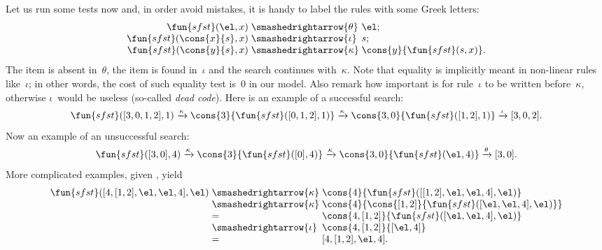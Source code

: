 Let us run some tests now and, in order avoid mistakes, it is handy to
label the rules with some Greek letters:
\begin{equation*}
\begin{array}{r@{\;}l@{\;}l}
\fun{sfst}(\el,x)          & \smashedrightarrow{\theta} & \el;\\
\fun{sfst}(\cons{x}{s},x)  & \smashedrightarrow{\iota}  & s;\\
\fun{sfst}(\cons{y}{s},x)  & \smashedrightarrow{\kappa} &
\cons{y}{\fun{sfst}(s,x)}.
\end{array}
\end{equation*}
The item is absent in~\(\theta\), the item is found in~\(\iota\) and
the search continues with~\(\kappa\). Note that equality is implicitly
meant in non\hyp{}linear rules like~\(\iota\); in other words, the
cost of such equality test is~\(0\) in our model. Also remark how
important is for rule~\(\iota\) to be written before~\(\kappa\),
otherwise \(\iota\)~would be useless (so\hyp{}called \emph{dead
  code}). Here is an
example of a successful search:
\begin{equation*}
\fun{sfst}([3,0,1,2],1) \xrightarrow{\smash{\kappa}}
\cons{3}{\fun{sfst}([0,1,2],1)} \xrightarrow{\smash{\kappa}}
\cons{3,0}{\fun{sfst}([1,2],1)} \xrightarrow{\smash{\iota}} [3,0,2].
\end{equation*}
Now an example of an unsuccessful search:
\begin{equation*}
\fun{sfst}([3,0],4) \xrightarrow{\smash{\kappa}}
\cons{3}{\fun{sfst}([0],4)} \xrightarrow{\smash{\kappa}}
\cons{3,0}{\fun{sfst}(\el,4)} \xrightarrow{\smash{\theta}}
[3,0].
\end{equation*}
More complicated examples, given , yield
\begin{equation*}
\begin{array}{r@{\;}l@{\;}l}
\fun{sfst}([4,[1,2],\el,\el,4],\el)
& \smashedrightarrow{\kappa} &
  \cons{4}{\fun{sfst}([[1,2],\el,\el,4],\el)}\\
& \smashedrightarrow{\kappa} &
  \cons{4}{\cons{[1,2]}{\fun{sfst}([\el,\el,4],\el)}}\\
& = & \cons{4, [1,2]}{\fun{sfst}([\el,\el,4],\el)}\\
& \smashedrightarrow{\iota} & \cons{4,[1,2]}{[\el,4]}\\
& = & [4,[1,2],\el,4].
\end{array}
\end{equation*}
